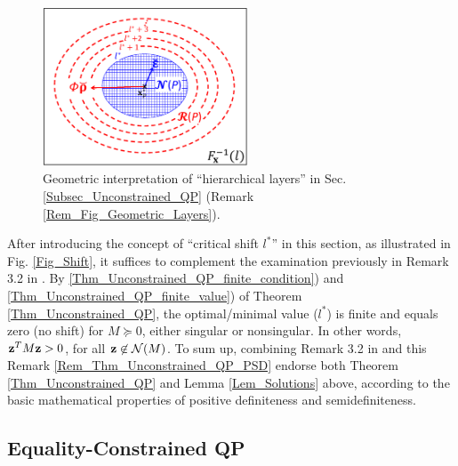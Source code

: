 \documentclass{imaman}
\newcommand{\bfz}{{\bf z}}
\newcommand{\calN}{{\mathcal N}}
\numberwithin{equation}{section}
\begin{document}
\begin{figure}[htbp]
    \begin{center}
    \includegraphics[width=6.1cm]{Fig_Layers.eps}
    \caption{Geometric interpretation of ``hierarchical layers'' in Sec. {\rm\ref{Subsec_Unconstrained_QP}} (Remark {\rm\ref{Rem_Fig_Geometric_Layers}}).}
    \label{Fig_Layers}
    \end{center}
\end{figure}

\begin{remark}
After introducing the concept of ``critical shift $l^*$'' in this section, as illustrated in Fig. \ref{Fig_Shift}, it suffices to complement the examination previously in Remark 3.2 in \cite{LiLiHs:20}. By \ref{Thm_Unconstrained_QP_finite_condition}) and \ref{Thm_Unconstrained_QP_finite_value}) of Theorem \ref{Thm_Unconstrained_QP}, the optimal/minimal value ($l^*$) is finite and equals zero (no shift) for $M\succeq 0$, either singular or nonsingular. In other words, $\bfz^TM\bfz>0$, for all $\bfz\not\in\calN(M)$. To sum up, combining Remark 3.2 in \cite{LiLiHs:20} and this Remark \ref{Rem_Thm_Unconstrained_QP_PSD} endorse both Theorem \ref{Thm_Unconstrained_QP} and Lemma \ref{Lem_Solutions} above, according to the basic mathematical properties of positive definiteness and semidefiniteness.
\label{Rem_Thm_Unconstrained_QP_PSD}
\end{remark}

\subsection{Equality-Constrained QP}
\label{Subsec_Equality_QP}
\end{document}
